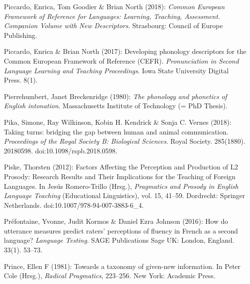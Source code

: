 \begin{styleBibliography}
Piccardo, Enrica, Tom Goodier \& Brian North (2018): \textit{Common European Framework of Reference for Languages: Learning, Teaching, Assessment. Companion Volume with New Descriptors}. Strasbourg: Council of Europe Publishing.
\end{styleBibliography}

\begin{styleBibliography}
Piccardo, Enrica \& Brian North (2017): Developing phonology descriptors for the Common European Framework of Reference (CEFR). \textit{Pronunciation in Second Language Learning and Teaching Proceedings}. Iowa State University Digital Press. 8(1).
\end{styleBibliography}

\begin{styleBibliography}
Pierrehumbert, Janet Breckenridge (1980): \textit{The phonology and phonetics of English intonation}. Massachusetts Institute of Technology (= PhD Thesis).
\end{styleBibliography}

\begin{styleBibliography}
Pika, Simone, Ray Wilkinson, Kobin H. Kendrick \& Sonja C. Vernes (2018): Taking turns: bridging the gap between human and animal communication. \textit{Proceedings of the Royal Society B: Biological Sciences}. Royal Society. 285(1880). 20180598. doi:10.1098/rspb.2018.0598.
\end{styleBibliography}

\begin{styleBibliography}
Piske, Thorsten (2012): Factors Affecting the Perception and Production of L2 Prosody: Research Results and Their Implications for the Teaching of Foreign Languages. In Jesús Romero-Trillo (Hrsg.), \textit{Pragmatics and Prosody in English Language Teaching} (Educational Linguistics), vol. 15, 41–59. Dordrecht: Springer Netherlands. doi:10.1007/978-94-007-3883-6\_4.
\end{styleBibliography}

\begin{styleBibliography}
Préfontaine, Yvonne, Judit Kormos \& Daniel Ezra Johnson (2016): How do utterance measures predict raters’ perceptions of fluency in French as a second language? \textit{Language Testing}. SAGE Publications Sage UK: London, England. 33(1). 53–73.
\end{styleBibliography}

\begin{styleBibliography}
Prince, Ellen F (1981): Towards a taxonomy of given-new information. In Peter Cole (Hrsg.), \textit{Radical Pragmatics}, 223–256. New York: Academic Press.
\end{styleBibliography}

